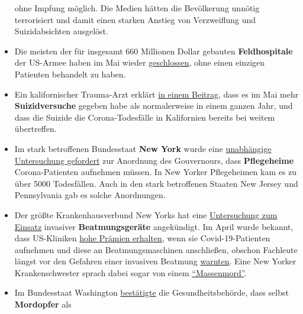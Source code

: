 \begin{itemize}
  ohne Impfung möglich. Die Medien hätten die Bevölkerung unnötig
  terrorisiert und damit einen starken Anstieg von Verzweiflung und
  Suizidabsichten ausgelöst.
\item
  Die meisten der für insgesamt 660 Millionen Dollar gebauten
  \textbf{Feldhospitale} der US-Armee haben im Mai wieder
  \href{https://www.npr.org/2020/05/07/851712311/u-s-field-hospitals-stand-down-most-without-treating-any-covid-19-patients}{geschlossen},
  ohne einen einzigen Patienten behandelt zu haben.
\item
  Ein kalifornischer Trauma-Arzt erklärt
  \href{https://www.dailymail.co.uk/news/article-8347011/Doctors-California-say-people-killed-four-weeks-YEAR.html}{in
  einem Beitrag}, dass es im Mai mehr \textbf{Suizidversuche} gegeben
  habe als normalerweise in einem ganzen Jahr, und dass die Suizide die
  Corona-Todesfälle in Kalifornien bereits bei weitem übertreffen.
\item
  Im stark betroffenen Bundesstaat \textbf{New York} wurde eine
  \href{https://nypost.com/2020/05/12/calls-for-independent-probe-of-gov-cuomos-nursing-home-policies/}{unabhängige
  Untersuchung gefordert} zur Anordnung des Gouvernours, dass
  \textbf{Pflegeheime} Corona-Patienten aufnehmen müssen. In New Yorker
  Pflegeheimen kam es zu über 5000 Todesfällen. Auch in den stark
  betroffenen Staaten New Jersey und Pennsylvania gab es solche
  Anordnungen.
\item
  Der größte Krankenhausverbund New Yorks hat eine
  \href{https://nypost.com/2020/05/29/northwell-health-probing-use-of-ventilators-for-covid-patients/}{Untersuchung
  zum Einsatz} invasiver \textbf{Beatmungsgeräte} angekündigt. Im April
  wurde bekannt, dass US-Kliniken
  \href{https://eu.usatoday.com/story/news/factcheck/2020/04/24/fact-check-medicare-hospitals-paid-more-covid-19-patients-coronavirus/3000638001/}{hohe
  Prämien erhalten}, wenn sie Covid-19-Patienten aufnehmen und diese an
  Beatmungsmaschinen anschließen, obschon Fachleute längst vor den
  Gefahren einer invasiven Beatmung
  \href{https://off-guardian.org/2020/05/06/covid19-are-ventilators-killing-people/}{warnten}.
  Eine New Yorker Krankenschwester sprach dabei sogar von einem
  \href{https://nypost.com/2020/05/29/northwell-health-probing-use-of-ventilators-for-covid-patients/}{``Massenmord''}.
\item
  Im Bundesstaat Washington
  \href{https://www.freedomfoundation.com/washington/washington-health-officials-gunshot-victims-counted-as-covid-19-deaths/}{bestätigte}
  die Gesundheitsbehörde, dass selbst \textbf{Mordopfer} als

\end{itemize}
